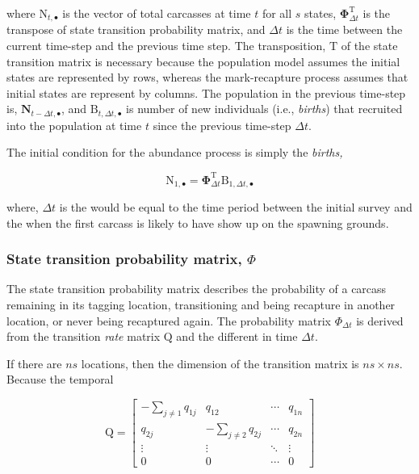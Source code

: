 \documentclass[
  letterpaper,
  DIV=11,
  numbers=noendperiod]{scrartcl}
\begin{document}
where \(\mathbf{\mathrm{N}}_{t,\bullet}\) is the vector of total
carcasses at time \(t\) for all \(s\) states,
\(\boldsymbol{\Phi}_{\Delta t}^\mathrm{T}\) is the transpose of state
transition probability matrix, and \(\Delta t\) is the time between the
current time-step and the previous time step. The transposition,
\(\mathrm{T}\) of the state transition matrix is necessary because the
population model assumes the initial states are represented by rows,
whereas the mark-recapture process assumes that initial states are
represent by columns. The population in the previous time-step is,
\(\mathbf{N}_{t-\Delta t,\bullet}\), and
\(\mathrm{B}_{t,\Delta t, \bullet}\) is number of new individuals (i.e.,
\emph{births}) that recruited into the population at time \(t\) since
the previous time-step \(\Delta t\).

The initial condition for the abundance process is simply the
\emph{births,}

\[
\mathbf{\mathrm{N}}_{1,\bullet} = \boldsymbol{\Phi}_{\Delta t}^\mathrm{T} \mathrm{B}_{1,\Delta t,\bullet}
\]

where, \(\Delta t\) is the would be equal to the time period between the
initial survey and the when the first carcass is likely to have show up
on the spawning grounds.

\hypertarget{state-transition-probability-matrix-phi}{%
\subsubsection{\texorpdfstring{State transition probability matrix,
\(\Phi\)}{State transition probability matrix, \textbackslash Phi}}\label{state-transition-probability-matrix-phi}}

The state transition probability matrix describes the probability of a
carcass remaining in its tagging location, transitioning and being
recapture in another location, or never being recaptured again. The
probability matrix \(\Phi_{\Delta t}\) is derived from the transition
\emph{rate} matrix \(\mathrm{Q}\) and the different in time
\(\Delta t\).

If there are \(ns\) locations, then the dimension of the transition
matrix is \(ns \times ns\). Because the temporal

\[
\mathrm{Q} =
\begin{bmatrix}
-\sum_{j\neq1}q_{1j} & q_{12} & \cdots & q_{1n} \\
q_{2j} & -\sum_{j\neq2}q_{2j} & \cdots & q_{2n} \\
\vdots & \vdots & \ddots & \vdots \\
0 & 0 & \cdots & 0
\end{bmatrix}
\]
\end{document}
